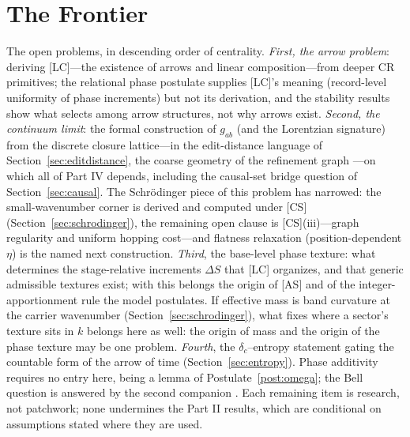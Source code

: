 \documentclass[11pt]{article}
\theoremstyle{definition}
\theoremstyle{remark}
\begin{document}
\section{The Frontier}\label{sec:frontier}
The open problems, in descending order of centrality. \emph{First, the arrow problem}: deriving [LC]---the existence of arrows and linear composition---from deeper CR primitives; the relational phase postulate supplies [LC]'s meaning (record-level uniformity of phase increments) but not its derivation, and the stability results show what selects among arrow structures, not why arrows exist. \emph{Second, the continuum limit}: the formal construction of $g_{ab}$ (and the Lorentzian signature) from the discrete closure lattice---in the edit-distance language of Section~\ref{sec:editdistance}, the coarse geometry of the refinement graph \cite{Gromov1993}---on which all of Part IV depends, including the causal-set bridge question of Section~\ref{sec:causal}. The Schr\"odinger piece of this problem has narrowed: the small-wavenumber corner is derived and computed under [CS] (Section~\ref{sec:schrodinger}), the remaining open clause is [CS](iii)---graph regularity and uniform hopping cost---and flatness relaxation (position-dependent $\eta$) is the named next construction. \emph{Third}, the base-level phase texture: what determines the stage-relative increments $\Delta S$ that [LC] organizes, and that generic admissible textures exist; with this belongs the origin of [AS] and of the integer-apportionment rule the model postulates. If effective mass is band curvature at the carrier wavenumber (Section~\ref{sec:schrodinger}), what fixes where a sector's texture sits in $k$ belongs here as well: the origin of mass and the origin of the phase texture may be one problem. \emph{Fourth}, the $\delta_c$--entropy statement gating the countable form of the arrow of time (Section~\ref{sec:entropy}). Phase additivity requires no entry here, being a lemma of Postulate~\ref{post:omega}; the Bell question is answered by the second companion \cite{TillittCHSH}. Each remaining item is research, not patchwork; none undermines the Part II results, which are conditional on assumptions stated where they are used.
\end{document}
